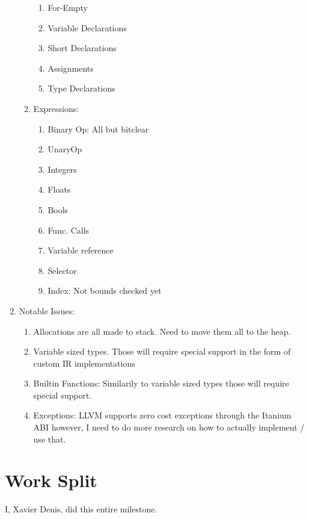 \documentclass[11pt]{article}
\begin{document}
\begin{enumerate}
\begin{enumerate}
\begin{enumerate}
    \item For-Empty
    \item Variable Declarations
    \item Short Declarations
    \item Assignments
    \item Type Declarations
  \end{enumerate}
  \item Expressions: \begin {enumerate}
    \item Binary Op: All but bitclear
    \item UnaryOp
    \item Integers
    \item Floats
    \item Bools
    \item Func. Calls
    \item Variable reference
    \item Selector
    \item Index: Not bounds checked yet
  \end{enumerate}
\end {enumerate}

\item Notable Issues: \begin{enumerate}
  \item Allocations are all made to stack. Need to move them all to the heap.
  \item Variable sized types. Those will require special support in the form of custom IR implementations
  \item Builtin Functions: Similarily to variable sized types those will require special support.
  \item Exceptions: LLVM supports zero cost exceptions through the Itanium ABI however, I need to do more research on how to actually implement / use that. 
\end{enumerate}
\end{enumerate}

\section {Work Split}

I, Xavier Denis, did this entire milestone.
\end{document}
